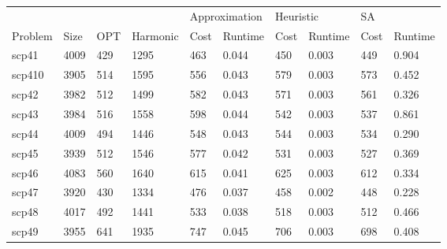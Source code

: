 \documentclass{report}
\begin{document}
\begin{table}[]
\centering
\begin{tabular}{@{}llllllllll@{}}
\toprule
        &      &     &          & \multicolumn{2}{l}{Approximation} & \multicolumn{2}{l}{Heuristic} & \multicolumn{2}{l}{SA} \\
Problem & Size & OPT & Harmonic & Cost           & Runtime          & Cost         & Runtime        & Cost     & Runtime     \\ \midrule
scp41   & 4009 & 429 & 1295     & 463            & 0.044            & 450          & 0.003          & 449      & 0.904       \\
scp410  & 3905 & 514 & 1595     & 556            & 0.043            & 579          & 0.003          & 573      & 0.452       \\
scp42   & 3982 & 512 & 1499     & 582            & 0.043            & 571          & 0.003          & 561      & 0.326       \\
scp43   & 3984 & 516 & 1558     & 598            & 0.044            & 542          & 0.003          & 537      & 0.861       \\
scp44   & 4009 & 494 & 1446     & 548            & 0.043            & 544          & 0.003          & 534      & 0.290       \\
scp45   & 3939 & 512 & 1546     & 577            & 0.042            & 531          & 0.003          & 527      & 0.369       \\
scp46   & 4083 & 560 & 1640     & 615            & 0.041            & 625          & 0.003          & 612      & 0.334       \\
scp47   & 3920 & 430 & 1334     & 476            & 0.037            & 458          & 0.002          & 448      & 0.228       \\
scp48   & 4017 & 492 & 1441     & 533            & 0.038            & 518          & 0.003          & 512      & 0.466       \\
scp49   & 3955 & 641 & 1935     & 747            & 0.045            & 706          & 0.003          & 698      & 0.408       \\ \bottomrule
\end{tabular}
\end{table}
\end{document}
